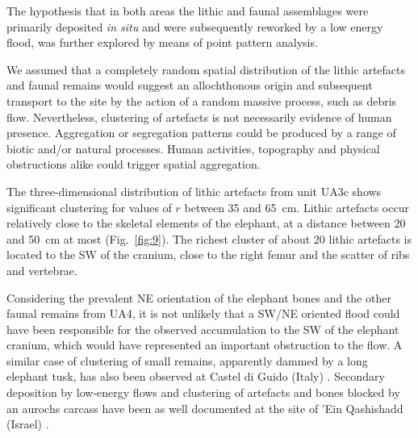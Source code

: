 \documentclass[review,authoryear,times]{elsarticle} %
\begin{document}


The hypothesis that in both areas the lithic and faunal assemblages were primarily deposited \emph{in situ} and were subsequently reworked by a low energy flood, was further explored by means of point pattern analysis.

We assumed that a completely random spatial distribution of the lithic artefacts and faunal remains would suggest an allochthonous origin and subsequent transport to the site by the action of a random massive process, such as debris flow. Nevertheless, clustering of artefacts is not necessarily evidence of human presence. Aggregation or segregation patterns could be produced by a range of biotic and/or natural processes. Human activities, topography and physical obstructions alike could trigger spatial aggregation.


The three-dimensional distribution of lithic artefacts from unit UA3c shows significant clustering for values of $r$ between 35 and 65~cm. Lithic artefacts occur relatively close to the skeletal elements of the elephant, at a distance between 20 and 50~cm at most (Fig.~\ref{fig:9}). The richest cluster of about 20 lithic artefacts is located to the SW of the cranium, close to the right femur and the scatter of ribs and vertebrae.

Considering the prevalent NE orientation of the elephant bones and the other faunal remains from UA4, it is not unlikely that a SW/NE oriented flood could have been responsible for the observed accumulation to the SW of the elephant cranium, which would have represented an important obstruction to the flow. A similar case of clustering of small remains, apparently dammed by a long elephant tusk, has also been observed at Castel di Guido (Italy) \citep{Boschian2010}. Secondary deposition by low-energy flows and clustering of artefacts and bones blocked by an aurochs carcass have been as well documented at the site of 'Ein Qashishadd (Israel) \citep{Hovers2014}.
\end{document}
